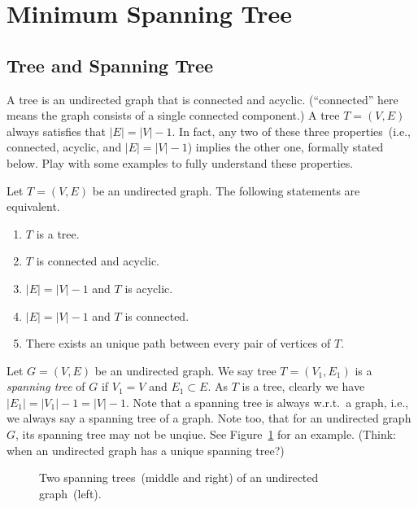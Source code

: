 \setcounter{definition}{0} \setcounter{property}{0} \setcounter{claim}{0} \setcounter{fact}{0} \setcounter{corollary}{0} \setcounter{figure}{0}
\section{Minimum Spanning Tree}

\subsection*{Tree and Spanning Tree}

A tree is an undirected graph that is connected and acyclic.
(``connected'' here means the graph consists of a single connected component.)
A tree $T = (V, E)$ always satisfies that $|E| = |V| - 1$.
In fact, any two of these three properties~(i.e., connected, acyclic, and $|E| = |V| - 1$)
implies the other one, formally stated below. Play with some examples
to fully understand these properties.

\begin{fact}\label{mst-fact1}
Let $T = (V, E)$ be an undirected graph. The following statements are equivalent.
\vspace*{-\topsep}
\begin{enumerate}
\item $T$ is a tree.
\item $T$ is connected and acyclic.
\item $|E| = |V| - 1$ and $T$ is acyclic.
\item $|E| = |V| - 1$ and $T$ is connected.
\item There exists an unique path between every pair of vertices of $T$.
\end{enumerate}
\end{fact}

Let $G = (V,E)$ be an undirected graph.
We say tree $T = (V_1, E_1)$ is a \emph{spanning tree}
of $G$ if $V_1 = V$ and $E_1\subset E$.
As $T$ is a tree, clearly we have $|E_1| = |V_1| - 1 = |V| - 1$.
Note that a spanning tree is always w.r.t.\ a graph, i.e., we always
say a spanning tree of a graph. Note too, that for an undirected graph $G$, 
its spanning tree may not be unqiue. See Figure~\ref{fig:mst-spanning}
for an example.  (Think: when an undirected graph has a unique spanning tree?)

\begin{figure}[h]
\centering{}
\caption{Two spanning trees~(middle and right) of an undirected graph~(left).}
\label{fig:mst-spanning}
\end{figure}

